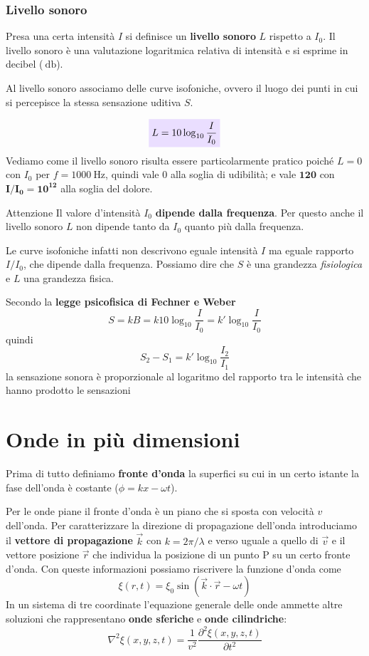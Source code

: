 \documentclass[x11names]{report}
\newcommand{\viola}[1]{\colorbox{yred}{$\displaystyle #1$}}
\begin{document}
	
	
	
	
	
	\subsubsection{Livello sonoro}
	Presa una certa intensità \(I\) si definisce un \textbf{livello sonoro} \(L\) rispetto a \(I_0\). Il livello sonoro è una valutazione logaritmica relativa di intensità e si esprime in decibel (\(\SI{}{\decibel}\)).
	
	Al livello sonoro associamo delle curve isofoniche, ovvero il luogo dei punti in cui si percepisce la stessa sensazione uditiva \(S\). 
	
	\begin{equation}\label{livello sonoro}
		\viola{L = 10\log_{10}{\frac{I}{I_0}}}
	\end{equation}
	Vediamo come il livello sonoro risulta essere particolarmente pratico poiché \(L = 0\) con \(I_0\) per \(f=1000\SI{}{\hertz}\), quindi vale 0 alla soglia di udibilità; e vale \(\boldsymbol{120}\) con \(\boldsymbol{I/I_0 = 10^{12}}\) alla soglia del dolore.
	
	\begin{es}{Attenzione}
		Il valore d'intensità \(I_0\) \textbf{dipende dalla frequenza}. Per questo anche il livello sonoro \(L\) non dipende tanto da \(I_0\) quanto più dalla frequenza. 
		
		Le curve isofoniche infatti non descrivono eguale intensità \(I\) ma eguale rapporto \(I/I_0\), che dipende dalla frequenza. Possiamo dire che \(S\) è una grandezza \textit{fisiologica} e \(L\) una grandezza fisica.
	\end{es}
	Secondo la \textbf{legge psicofisica di Fechner e Weber}
	\[ 
	S = kB = k10\log_10{\frac{I}{I_0}} = k'\log_10{\frac{I}{I_0}}
	\]
	quindi
	\begin{equation}
		S_2 - S_1 = k'\log_10{\frac{I_2}{I_1}}
	\end{equation}
	la sensazione sonora è proporzionale al logaritmo del rapporto tra le intensità che hanno prodotto le sensazioni
	
	
	\section{Onde in più dimensioni}	
	Prima di tutto definiamo \textbf{fronte d'onda} la superfici su cui in un certo istante la fase dell'onda è costante (\(\phi = kx -\omega t\)). 

	Per le onde piane il fronte d'onda è un piano che si sposta con velocità \(v\) dell'onda. Per caratterizzare la direzione di propagazione dell'onda introduciamo il \textbf{vettore di propagazione} \(\vec{k}\) con \(k = 2\pi/\lambda\) e verso uguale a quello di \(\vec{v}\) e il vettore posizione \(\vec{r}\) che individua la posizione di un punto P su un certo fronte d'onda. Con queste informazioni possiamo riscrivere la funzione d'onda come
	\[ 
	\xi(r,t) = \xi_0 \sin\left(\vec{k}\cdot \vec{r}- \omega t\right) 
	\]
	In un sistema di tre coordinate l'equazione generale delle onde ammette altre soluzioni che rappresentano \textbf{onde sferiche} e \textbf{onde cilindriche}: 
	\[ 
	\nabla^2\xi (x,y,z,t) = \frac{1}{v^2}\frac{\partial^2\xi (x,y,z,t)}{\partial t^2}
	\]
\end{document}
